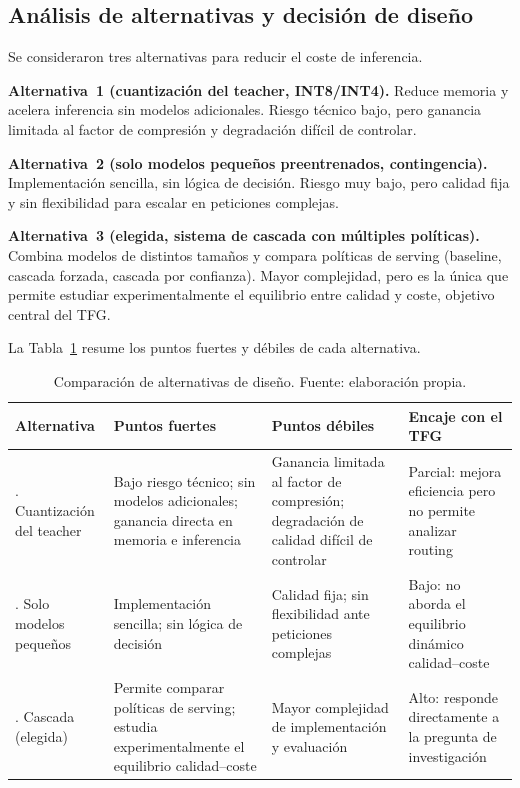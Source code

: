 \subsection{Análisis de alternativas y decisión de diseño}

Se consideraron tres alternativas para reducir el coste de inferencia.

\textbf{Alternativa~1 (cuantización del teacher, INT8/INT4).} Reduce memoria y acelera inferencia sin modelos adicionales. Riesgo técnico bajo, pero ganancia limitada al factor de compresión y degradación difícil de controlar.

\textbf{Alternativa~2 (solo modelos pequeños preentrenados, contingencia).} Implementación sencilla, sin lógica de decisión. Riesgo muy bajo, pero calidad fija y sin flexibilidad para escalar en peticiones complejas.

\textbf{Alternativa~3 (elegida, sistema de cascada con múltiples políticas).} Combina modelos de distintos tamaños y compara políticas de serving (baseline, cascada forzada, cascada por confianza). Mayor complejidad, pero es la única que permite estudiar experimentalmente el equilibrio entre calidad y coste, objetivo central del TFG.

La Tabla~\ref{tab:alternativas} resume los puntos fuertes y débiles de cada alternativa.

\begin{table}[H]
\centering
\caption{Comparación de alternativas de diseño. Fuente: elaboración propia.}
\label{tab:alternativas}
\footnotesize
\begin{tabularx}{\textwidth}{>{\raggedright\arraybackslash}p{2.8cm} >{\raggedright\arraybackslash}X >{\raggedright\arraybackslash}X >{\raggedright\arraybackslash}p{3cm}}
\toprule
\textbf{Alternativa} & \textbf{Puntos fuertes} & \textbf{Puntos débiles} & \textbf{Encaje con el TFG} \\
\midrule
1. Cuantización del teacher & Bajo riesgo técnico; sin modelos adicionales; ganancia directa en memoria e inferencia & Ganancia limitada al factor de compresión; degradación de calidad difícil de controlar & Parcial: mejora eficiencia pero no permite analizar routing \\
\addlinespace
2. Solo modelos pequeños & Implementación sencilla; sin lógica de decisión & Calidad fija; sin flexibilidad ante peticiones complejas & Bajo: no aborda el equilibrio dinámico calidad--coste \\
\addlinespace
3. Cascada (elegida) & Permite comparar políticas de serving; estudia experimentalmente el equilibrio calidad--coste & Mayor complejidad de implementación y evaluación & Alto: responde directamente a la pregunta de investigación \\
\bottomrule
\end{tabularx}
\end{table}

